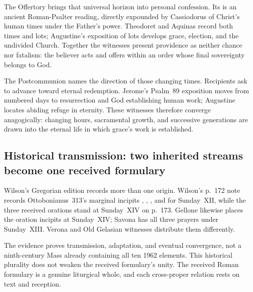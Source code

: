 The Offertory brings that universal horizon into personal confession. Its
 is an ancient Roman-Psalter reading, directly expounded by
Cassiodorus of Christ's human times under the Father's power. Theodoret and
Aquinas record both times and lots; Augustine's exposition of lots develops
grace, election, and the undivided Church. Together the witnesses present
providence as neither chance nor fatalism: the believer acts and offers within
an order whose final sovereignty belongs to God.

The Postcommunion names the direction of those changing times. Recipients ask
to advance toward eternal redemption. Jerome's Psalm~89 exposition moves from
numbered days to resurrection and God establishing human work; Augustine
locates abiding refuge in eternity. These witnesses therefore converge
anagogically: changing hours, sacramental growth, and successive generations are
drawn into the eternal life in which grace's work is established.

\ifdefined\TriptychSynthesisEdition\else
\subsection*{Historical transmission: two inherited streams become one received formulary}

Wilson's Gregorian edition records more than one origin.
Wilson's p.~172 note records Ottobonianus~313's marginal incipits
, , , and  for Sunday~XII, while the three received orations stand at Sunday~XIV on
p.~173. Gellone likewise places the oration incipits at
Sunday~XIV; Savona has all three prayers under Sunday~XIII. Verona and Old
Gelasian witnesses distribute them differently.

The evidence proves transmission, adaptation, and eventual convergence, not a
ninth-century Mass already containing all ten 1962 elements. This historical
plurality does not weaken the received formulary's unity. The received Roman
formulary is a genuine liturgical whole, and each cross-proper relation rests
on text and reception.
\fi
